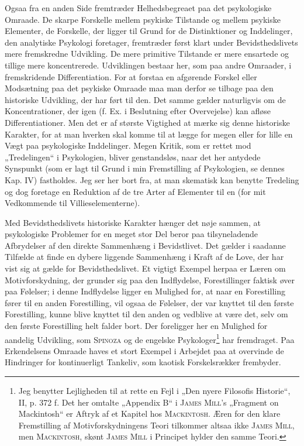 \documentclass[12pt]{article}
\begin{document}
Ogsaa fra en anden Side fremtræder Helhedsbegreaet paa det psykologiske
Omraade. De skarpe Forskelle mellem psykiske Tilstande og mellem psykiske
Elementer, de Forskelle, der ligger til Grund for de Distinktioner og Inddelinger,
den analytiske Psykologi foretager, fremtræder først klart under Bevidsthedslivets
mere fremskredne Udvikling. De mere primitive Tilstande er mere ensartede og
tillige mere koncentrerede. Udviklingen bestaar her, som paa andre Omraader, i
fremskridende Differentiation. For at forstaa en afgørende Forskel eller
Modsætning paa det psykiske Omraade maa man derfor se tilbage paa den historiske
Udvikling, der har ført til den. Det samme gælder naturligvis om de Koncentrationer,
der igen (f. Ex. i Beslutning efter Overvejelse) kan afløse Differentiationer. Men
det er af største Vigtighed at mærke sig denne historiske Karakter, for at man
hverken skal komme til at lægge for megen eller for lille en Vægt paa psykologiske
Inddelinger. Megen Kritik, som er rettet mod „Tredelingen“ i Psykologien, bliver
genstandsløs, naar det her antydede Synspunkt (som er lagt til Grund i min
Fremstilling af Psykologien, se dennes Kap. IV) fastholdes. Jeg ser her bort fra, at man
skematisk kan benytte Tredeling og dog foretage en Reduktion af de tre Arter af
Elementer til en (for mit Vedkommende til Villieselementerne).

Med Bevidsthedslivets historiske Karakter hænger det nøje sammen, at
psykologiske Problemer for en meget stor Del beror paa tilsyneladende Afbrydelser af
den direkte Sammenhæng i Bevidstlivet. Det gælder i saadanne Tilfælde at finde
en dybere liggende Sammenhæng i Kraft af de Love, der har vist sig at gælde
for Bevidsthedslivet. Et vigtigt Exempel herpaa er Læren om Motivforskydning,
der grunder sig paa den Indflydelse, Forestillinger faktisk øver paa Følelser; i denne
Indflydelse ligger en Mulighed for, at naar en Forestilling fører til en anden
Forestilling, vil ogsaa de Følelser, der var knyttet til den første Forestilling, kunne blive
knyttet til den anden og vedblive at være det, selv om den første Forestilling helt
falder bort. Der foreligger her en Mulighed for aandelig Udvikling, som \textsc{Spinoza}
og de engelske Psykologer\footnote{Jeg benytter Lejligheden til at rette en Fejl
i „Den nyere Filosofis Historie“, II, p. 372 f. Det her omtalte „Appendix B“ i
\textsc{James Mill}'s „Fragment on Mackintosh“ er Aftryk af et Kapitel hos
\textsc{Mackintosh}. Æren for den klare Fremstilling af Motivforskydningens Teori
tilkommer altsaa ikke \textsc{James Mill}, men \textsc{Mackintosh}, skønt
\textsc{James Mill} i Principet hylder den samme Teori.} har fremdraget. Paa
Erkendelsens Omraade haves et stort Exempel i Arbejdet paa at overvinde de
Hindringer for kontinuerligt Tankeliv, som kaotisk Forskelsrækker frembyder.
\end{document}
